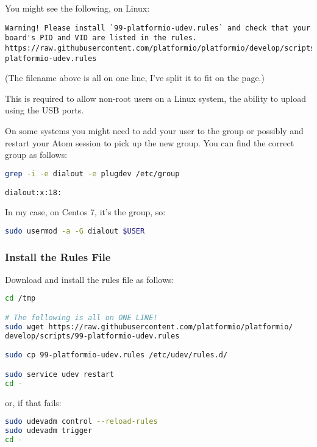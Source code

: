 You might see the following, on Linux:

\begin{lstlisting}
Warning! Please install `99-platformio-udev.rules` and check that your board's PID and VID are listed in the rules.
https://raw.githubusercontent.com/platformio/platformio/develop/scripts/99-platformio-udev.rules
\end{lstlisting}

(The filename above is all on one line, I've split it to fit on the page.)

This is required to allow non-root users on a Linux system, the ability
to upload using the USB ports. 

On some systems you might need to add your 
user to the group  or possibly  and 
restart your Atom session to pick up the new group. You can find the correct group
as follows:

\begin{lstlisting}[language=bash]
grep -i -e dialout -e plugdev /etc/group

dialout:x:18:
\end{lstlisting}

In my case, on Centos 7, it's the  group, so:

\begin{lstlisting}[language=bash]
sudo usermod -a -G dialout $USER
\end{lstlisting}


\subsubsection{Install the Rules File}\label{install-the-rules-file}

Download and install the rules file as follows:

\begin{lstlisting}[language=bash]
cd /tmp

# The following is all on ONE LINE!
sudo wget https://raw.githubusercontent.com/platformio/platformio/
develop/scripts/99-platformio-udev.rules

sudo cp 99-platformio-udev.rules /etc/udev/rules.d/

sudo service udev restart
cd -
\end{lstlisting}

or, if that fails:

\begin{lstlisting}[language=bash]
sudo udevadm control --reload-rules
sudo udevadm trigger
cd -
\end{lstlisting}


